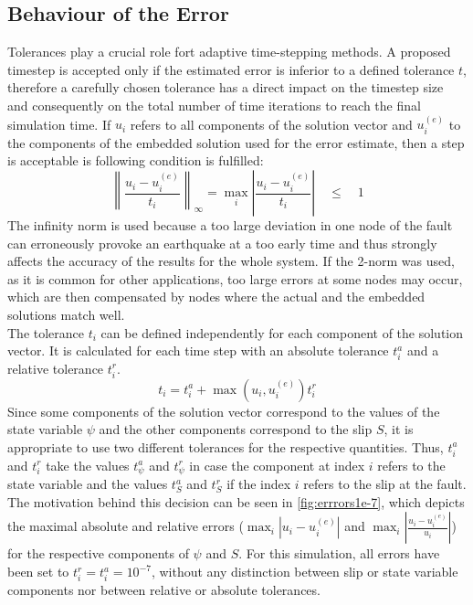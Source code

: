 \documentclass{report}
\begin{document}
\subsection{Behaviour of the Error}
Tolerances play a crucial role fort adaptive time-stepping methods. A proposed timestep is accepted only if the estimated error is inferior to a defined tolerance $t$, therefore a carefully chosen tolerance has a direct impact on the timestep size and consequently on the total number of time iterations to reach the final simulation time. If $u_i$ refers to all components of the solution vector and $u_i^{(e)}$ to the components of the embedded solution used for the error estimate, then a step is acceptable is following condition is fulfilled: 
\begin{equation}
    \left\|\frac{u_i - u_i^{(e)}}{t_i}\right\|_\infty = \max_i \left|\frac{u_i - u_i^{(e)}}{t_i}\right|
    \quad \leq \quad 1
\end{equation}
The infinity norm is used because a too large deviation in one node of the fault can erroneously provoke an earthquake at a too early time and thus strongly affects the accuracy of the results for the whole system. If the 2-norm was used, as it is common for other applications, too large errors at some nodes may occur, which are then compensated by nodes where the actual and the embedded solutions match well. \\
The tolerance $t_i$ can be defined independently for each component of the solution vector. It is calculated for each time step with an absolute tolerance $t_i^a$ and a relative tolerance $t_i^r$. 
\begin{equation}
    t_i = t_i^a + \max\left(u_i,u_i^{(e)}\right)t_i^r
\end{equation}
Since some components of the solution vector correspond to the values of the state variable $\psi$ and the other components correspond to the slip $S$, it is appropriate to use two different tolerances for the respective quantities. Thus, $t_i^a$ and $t_i^r$ take the values $t_\psi^a$ and $t_\psi^r$ in case the component at index $i$ refers to the state variable and the values $t_S^a$ and $t_S^r$ if the index $i$ refers to the slip at the fault. The motivation behind this decision can be seen in \autoref{fig:errrors1e-7}, which depicts the maximal absolute and relative errors ($\max_i\left|u_i-u_i^{(e)}\right|$ and $\max_i\left|\frac{u_i-u_i^{(e)}}{u_i}\right|$) for the respective components of $\psi$ and $S$. For this simulation, all errors have been set to $t_i^r = t_i^a = 10^{-7}$, without any distinction between slip or state variable components nor between relative or absolute tolerances.
\end{document}
